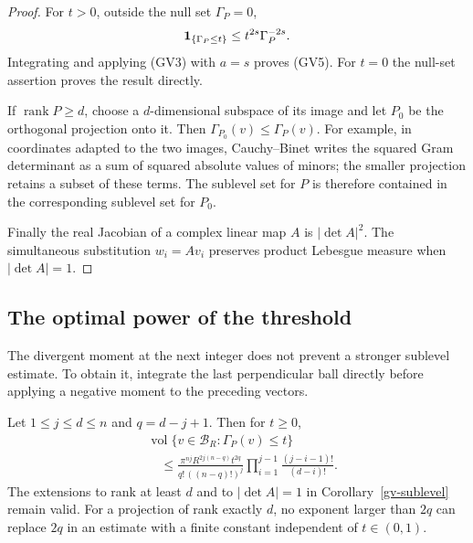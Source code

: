 \begin{proof}
For $t>0$, outside the null set $\Gamma_P=0$,
\[
        {\bf1}_{\{\Gamma_P\le t\}}
                    \le t^{2s}\Gamma_P^{-2s}.
\]
Integrating and applying (GV3) with $a=s$ proves (GV5).
For $t=0$ the null-set assertion proves the result directly.

If $\operatorname{rank}P\ge d$, choose a $d$-dimensional
subspace of its image and let $P_0$ be the orthogonal projection
onto it.  Then $\Gamma_{P_0}(v)\le\Gamma_P(v)$.  For example,
in coordinates adapted to the two images, Cauchy--Binet writes
the squared Gram determinant as a sum of squared absolute
values of minors; the smaller projection retains a subset
of these terms.  The sublevel set for $P$ is therefore
contained in the corresponding sublevel set for $P_0$.

Finally the real Jacobian of a complex linear map $A$ is
$|\det A|^2$.  The simultaneous substitution $w_i=Av_i$
preserves product Lebesgue measure when $|\det A|=1$.
\end{proof}

\subsection{The optimal power of the threshold}

The divergent moment at the next integer does not prevent
a stronger sublevel estimate.  To obtain it, integrate the
last perpendicular ball directly before applying a negative
moment to the preceding vectors.

\begin{theorem}\label{gv-optimal-power}
Let $1\le j\le d\le n$ and $q=d-j+1$.  Then for $t\ge0$,
\[
 \begin{split}
 &\operatorname{vol}\{v\in\mathcal B_R:\Gamma_P(v)\le t\}\\
 &\quad\le
  \frac{\pi^{nj}R^{2j(n-q)}t^{2q}}{q!\,((n-q)!)^j}
       \prod_{i=1}^{j-1}\frac{(j-i-1)!}{(d-i)!}.              \end{split}
 \tag{GV6}
\]
The extensions to rank at least $d$ and to $|\det A|=1$
in Corollary~\ref{gv-sublevel} remain valid.
For a projection of rank exactly $d$, no exponent larger
than $2q$ can replace $2q$ in an estimate with a finite
constant independent of $t\in(0,1)$.
\end{theorem}

